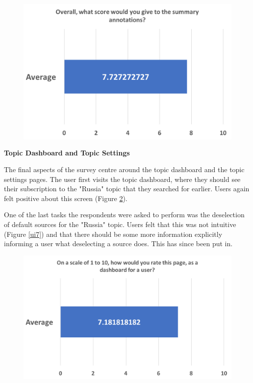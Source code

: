\documentclass[12pt]{article}
\begin{document}
\begin{figure}[ht!]
  \centering
    \includegraphics[scale=0.6]{ui5.png}
   \caption[A graph depicting responses to the User Interface Survey]{}
   \label{ui5}
\end{figure} 

\textbf{Topic Dashboard and Topic Settings}

The final aspects of the survey centre around the topic dashboard and the topic settings pages. The user first visits the topic dashboard, where they should see their subscription to the "Russia" topic that they searched for earlier. Users again felt positive about this screen (Figure \ref{ui6}).

One of the last tasks the respondents were asked to perform was the deselection of default sources for the "Russia" topic. Users felt that this was not intuitive (Figure \ref{ui7}) and that there should be some more information explicitly informing a user what deselecting a source does. This has since been put in.

\begin{figure}[ht!]
  \centering
    \includegraphics[scale=0.6]{ui6.png}
   \caption[A graph depicting responses to the User Interface Survey]{}
   \label{ui6}
\end{figure} 
\end{document}
